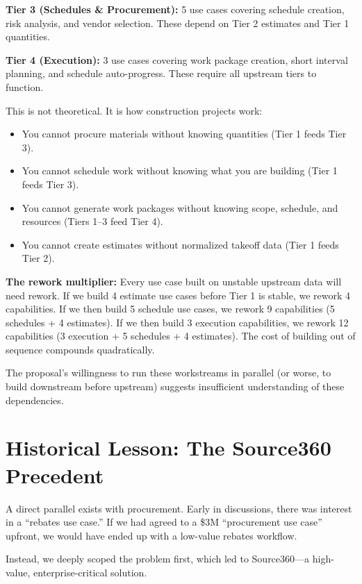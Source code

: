 \documentclass[11pt, letterpaper]{article}
\begin{document}
\textbf{Tier 3 (Schedules \& Procurement):} 5 use cases covering schedule creation, risk analysis, and vendor selection. These depend on Tier 2 estimates and Tier 1 quantities.

\textbf{Tier 4 (Execution):} 3 use cases covering work package creation, short interval planning, and schedule auto-progress. These require all upstream tiers to function.

This is not theoretical. It is how construction projects work:
\begin{itemize}
    \item You cannot procure materials without knowing quantities (Tier 1 feeds Tier 3).
    \item You cannot schedule work without knowing what you are building (Tier 1 feeds Tier 3).
    \item You cannot generate work packages without knowing scope, schedule, and resources (Tiers 1--3 feed Tier 4).
    \item You cannot create estimates without normalized takeoff data (Tier 1 feeds Tier 2).
\end{itemize}

\textbf{The rework multiplier:} Every use case built on unstable upstream data will need rework. If we build 4 estimate use cases before Tier 1 is stable, we rework 4 capabilities. If we then build 5 schedule use cases, we rework 9 capabilities (5 schedules + 4 estimates). If we then build 3 execution capabilities, we rework 12 capabilities (3 execution + 5 schedules + 4 estimates). The cost of building out of sequence compounds quadratically.

The proposal's willingness to run these workstreams in parallel (or worse, to build downstream before upstream) suggests insufficient understanding of these dependencies.

\vspace{1em}

\section*{Historical Lesson: The Source360 Precedent}

A direct parallel exists with procurement. Early in discussions, there was interest in a ``rebates use case.'' If we had agreed to a \$3M ``procurement use case'' upfront, we would have ended up with a low-value rebates workflow.

Instead, we deeply scoped the problem first, which led to Source360---a high-value, enterprise-critical solution.
\end{document}

